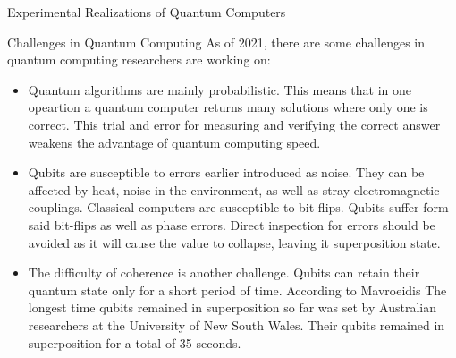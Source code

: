 \documentclass[aps,preprintnumbers,twocolumn]{revtex4}
\begin{document}
\begin{section}{Experimental Realizations of Quantum Computers}
\begin{section}{Challenges in Quantum Computing}
As of 2021, there are some challenges in quantum computing researchers are working on: 

\begin{itemize}
    \item Quantum algorithms are mainly probabilistic. 
    This means that in one opeartion a quantum computer returns many solutions where only one is correct. 
    This trial and error for measuring and verifying the correct answer weakens the advantage of quantum computing speed. 
    \item Qubits are susceptible to errors earlier introduced as noise. 
    They can be affected by heat, noise in the environment, 
    as well as stray electromagnetic couplings. 
    Classical computers are susceptible to bit-flips. Qubits suffer form said bit-flips as well as phase errors. 
    Direct inspection for errors should be avoided as it will cause the value to collapse, leaving it superposition state.
    \item The difficulty of coherence is another challenge. 
    Qubits can retain their quantum state only for a short period of time. 
    According to Mavroeidis \cite{DBLP:journals/corr/abs-1804-00200} The longest time qubits remained in superposition so far was set by Australian researchers at the University of New South Wales. 
    Their qubits remained in superposition for a total of 35 seconds.
\end{itemize}

\end{section}

\end{section}
\end{document}
